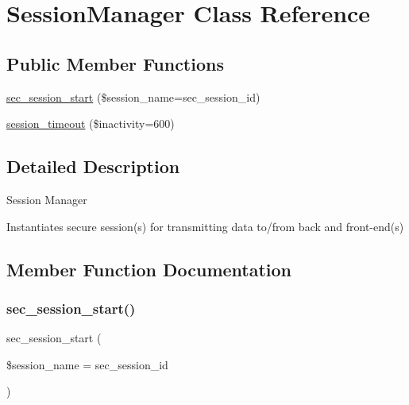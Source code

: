 \hypertarget{class_w_a_f_f_l_e_1_1_controllers_1_1_session_manager}{}\section{Session\+Manager Class Reference}
\label{class_w_a_f_f_l_e_1_1_controllers_1_1_session_manager}
\subsection*{Public Member Functions}
\begin{DoxyCompactItemize}
\item 
\hyperlink{class_w_a_f_f_l_e_1_1_controllers_1_1_session_manager_a3d98fd81ca4375c8e121fa1a6dd20074}{sec\+\_\+session\+\_\+start} (\$session\+\_\+name=\textquotesingle{}sec\+\_\+session\+\_\+id\textquotesingle{})
\item 
\hyperlink{class_w_a_f_f_l_e_1_1_controllers_1_1_session_manager_a0699e69686fe46ec84a3c0b680080414}{session\+\_\+timeout} (\$inactivity=600)
\end{DoxyCompactItemize}


\subsection{Detailed Description}
Session Manager

Instantiates secure session(s) for transmitting data to/from back and front-\/end(s) 

\subsection{Member Function Documentation}
\mbox{\label{class_w_a_f_f_l_e_1_1_controllers_1_1_session_manager_a3d98fd81ca4375c8e121fa1a6dd20074}} 
\subsubsection{\texorpdfstring{sec\+\_\+session\+\_\+start()}{sec\_session\_start()}}
{\footnotesize\ttfamily sec\+\_\+session\+\_\+start (\begin{DoxyParamCaption}\item[{}]{\$session\+\_\+name = {\ttfamily \textquotesingle{}sec\+\_\+session\+\_\+id\textquotesingle{}} }\end{DoxyParamCaption})}

